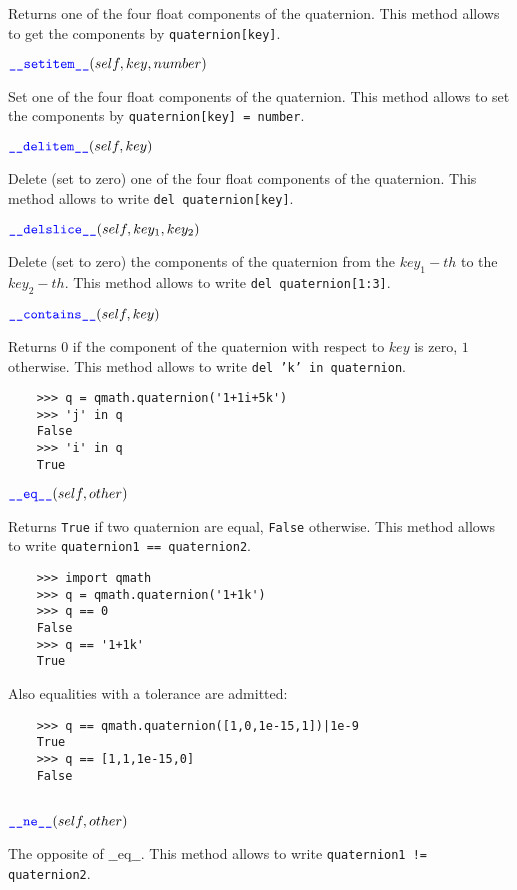 \documentclass[11pt]{paper}
\begin{document}
Returns one of the four float components of the quaternion. This method allows to get the components by \texttt{quaternion[key]}.

\medskip

\noindent $\textcolor{blue}{\texttt{\_\_\mbox{setitem}\_\_}}(self,key, number)$

Set one of the four float components of the quaternion. This method allows to set the components by \texttt{quaternion[key] = number}.

\medskip
\noindent $\textcolor{blue}{\texttt{\_\_\mbox{delitem}\_\_}}(self,key)$

Delete (set to zero) one of the four float components of the quaternion. This method allows to write \texttt{del quaternion[key]}.

\medskip
\noindent $\textcolor{blue}{\texttt{\_\_\mbox{delslice}\_\_}}(self,key_1,key_2)$

Delete (set to zero) the components of the quaternion from the $key_1-th$ to the $key_2-th$. This method allows to write \texttt{del quaternion[1:3]}.


\medskip
\noindent $\textcolor{blue}{\texttt{\_\_\mbox{contains}\_\_}}(self,key)$

Returns $0$ if the component of the quaternion with respect to $key$ is zero, $1$ otherwise. This method allows to write \texttt{del 'k' in quaternion}.
\begin{verbatim}
    >>> q = qmath.quaternion('1+1i+5k')
    >>> 'j' in q
    False
    >>> 'i' in q
    True
\end{verbatim}

\medskip
\noindent $\textcolor{blue}{\texttt{\_\_\mbox{eq}\_\_}}(self,other)$

Returns \texttt{True} if two quaternion are equal, \texttt{False} otherwise. This method allows to write \texttt{quaternion1 == quaternion2}.
\begin{verbatim}
    >>> import qmath
    >>> q = qmath.quaternion('1+1k')
    >>> q == 0
    False
    >>> q == '1+1k'
    True
\end{verbatim}
\noindent Also equalities with a tolerance are admitted:
\begin{verbatim}
    >>> q == qmath.quaternion([1,0,1e-15,1])|1e-9
    True
    >>> q == [1,1,1e-15,0]
    False
        
\end{verbatim}
\medskip
\noindent $\textcolor{blue}{\texttt{\_\_\mbox{ne}\_\_}}(self,other)$

The opposite of $\_\_$eq$\_\_$. This method allows to write \texttt{quaternion1 != quaternion2}.
\end{document}
